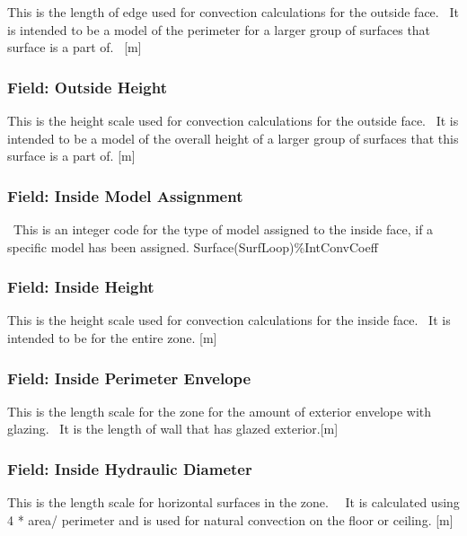 This is the length of edge used for convection calculations for the outside face.~ It is intended to be a model of the perimeter for a larger group of surfaces that surface is a part of.~ {[}m{]}

\subsubsection{Field: Outside Height}\label{field-outside-height}

This is the height scale used for convection calculations for the outside face.~ It is intended to be a model of the overall height of a larger group of surfaces that this surface is a part of. {[}m{]}

\subsubsection{Field: Inside Model Assignment}\label{field-inside-model-assignment}

~This is an integer code for the type of model assigned to the inside face, if a specific model has been assigned. Surface(SurfLoop)\%IntConvCoeff

\subsubsection{Field: Inside Height}\label{field-inside-height}

This is the height scale used for convection calculations for the inside face.~ It is intended to be for the entire zone. {[}m{]}

\subsubsection{Field: Inside Perimeter Envelope}\label{field-inside-perimeter-envelope}

This is the length scale for the zone for the amount of exterior envelope with glazing.~ It is the length of wall that has glazed exterior.{[}m{]}

\subsubsection{Field: Inside Hydraulic Diameter}\label{field-inside-hydraulic-diameter}

This is the length scale for horizontal surfaces in the zone.~~ It is calculated using 4 * area/ perimeter and is used for natural convection on the floor or ceiling. {[}m{]}

